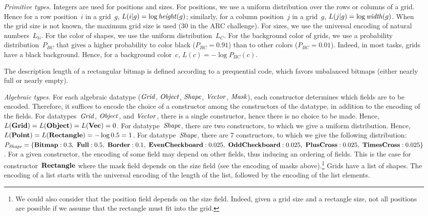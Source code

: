 \documentclass[a4paper]{llncs}
\newcommand{\KILL}[1]{}
\newcommand{\nat}{\mathbb{N}}
\begin{document}
{\em Primitive types.} Integers are used for positions and sizes. For
positions, we use a uniform distribution over the rows or columns of a
grid. Hence for a row position~$i$ in a grid~$g$,
$L(i|g) = \log {\it height}(g)$; similarly, for a column position~$j$
in a grid~$g$, $L(j|g) = \log {\it width}(g)$. When the grid size is
not known, the maximum grid size is used (30 in the ARC challenge).
%
For sizes, we use the universal encoding of natural numbers~$L_\nat$.
%
For the color of shapes, we use the uniform distribution~$L_C$. For
the background color of grids, we use a probability
distribution~$P_{BC}$ that gives a higher probability to color black
($P_{BC} = 0.91$) than to other colors ($P_{BC} = 0.01$). Indeed, in
most tasks, grids have a black background. Hence, for a background
color~$c$, $L(c) = -\log P_{BC}(c)$. \KILL{We then define the
  description length of background colors $L_{BC}(c)$ as
  $L_{P_{bc}}(c)$.}
%
\KILL{Version up to 2.2: The description length of a rectangular bitmap is simply defined as
  its number of cells: $L(m) = height(m) \times width(m)$.
}
%
The description length of a rectangular bitmap is defined according to
a prequential code, which favors unbalanced bitmaps (either nearly
full or nearly empty).

{\em Algebraic types.} For each algebraic datatype (${\it Grid}$,
${\it Object}$, ${\it Shape}$, ${\it Vector}$, ${\it Mask}$), each
constructor determines which fields are to be encoded. Therefore, it
suffices to encode the choice of a constructor among the constructors
of the datatype, in addition to the encoding of the fields. For
datatypes~${\it Grid}$, ${\it Object}$, and ${\it Vector}$, there is a
single constructor, hence there is no choice to be made. Hence,
$L({\bf Grid}) = L({\bf Object}) = L({\bf Vec}) = 0$. For
datatype~${\it Shape}$, there are two constructors, to which we give a
uniform distribution. Hence,
$L({\bf Point}) = L({\bf Rectangle}) = -\log 0.5 = 1$.  For
datatype~${\it Shape}$, there are 7 constructors, to which we give the
following distribution:
$P_{\it Shape} = \{ {\bf Bitmap}: 0.3,\ {\bf Full}: 0.5,\ {\bf Border}: 0.1,\ {\bf
  EvenCheckboard}: 0.025,\ {\bf OddCheckboard}: 0.025,\ {\bf PlusCross}:
0.025,\ {\bf TimesCross}: 0.025 \}$.
%
For a given constructor, the encoding of some field may depend on
other fields, thus inducing an ordering of fields. This is the case
for constructor~${\bf Rectangle}$ where the mask field depends on the
size field (see the encoding of masks above).\footnote{We could also consider
that the position field depends on the size field. Indeed, given a
grid size and a rectangle size, not all positions are possible if we
assume that the rectangle must fit into the grid.}
%
Grids have a list of shapes. The encoding of a list starts with the
universal encoding of the length of the list, followed by the encoding
of the list elements.
\end{document}

